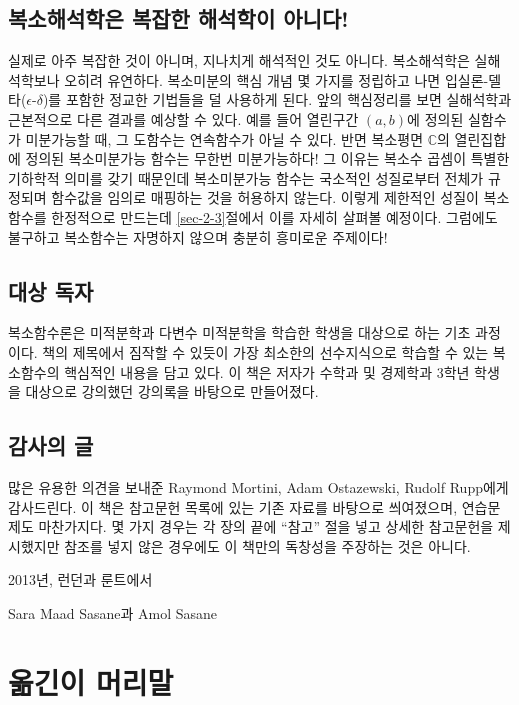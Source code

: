 \section*{복소해석학은 복잡한 해석학이 아니다!}


실제로 아주 복잡한 것이 아니며,  지나치게 해석적인 것도 아니다.
복소해석학은 실해석학보나 오히려 유연하다.
복소미분의 핵심 개념 몇 가지를 정립하고 나면 
입실론-델타($\epsilon$-$\delta$)를 포함한 정교한 기법들을 덜 사용하게 된다.
앞의 핵심정리를 보면 실해석학과 근본적으로 다른 결과를 예상할 수 있다.
예를 들어 열린구간 $(a,b)$에 정의된  실함수가 미분가능할 때, 그 도함수는 연속함수가 아닐 수 있다.
반면 복소평면 $\mathbb C$의 열린집합에 정의된 복소미분가능 함수는 
무한번 미분가능하다!
그 이유는 복소수 곱셈이 특별한 기하학적 의미를 갖기 때문인데
복소미분가능 함수는 국소적인 성질로부터 전체가 규정되며 
함수값을 임의로 매핑하는 것을 허용하지 않는다.
이렇게 제한적인 성질이 복소함수를 한정적으로 만드는데
\ref{sec-2-3}절에서 이를 자세히 살펴볼 예정이다.
그럼에도 불구하고 복소함수는 자명하지 않으며 충분히 흥미로운 주제이다!

\section*{대상 독자}

복소함수론은 미적분학과 다변수 미적분학을 학습한 학생을 대상으로 하는 기초 과정이다.
책의 제목에서 짐작할 수 있듯이
가장 최소한의 선수지식으로 학습할 수 있는 복소함수의 핵심적인 내용을 담고 있다.
이 책은 저자가 수학과 및 경제학과 3학년 학생을 대상으로 강의했던 강의록을 
바탕으로  만들어졌다.


\section*{감사의 글}

 많은 유용한 의견을 보내준 
Raymond Mortini, Adam Ostazewski, Rudolf Rupp에게 감사드린다.
이 책은 참고문헌 목록에 있는 기존 자료를 바탕으로 씌여졌으며, %
연습문제도 마찬가지다.
몇 가지 경우는 각 장의 끝에 ``참고'' 절을 넣고 상세한 참고문헌을 제시했지만
참조를 넣지 않은 경우에도 이 책만의 독창성을 주장하는 것은 아니다.

\begin{flushright}
2013년, 런던과 룬트에서

Sara Maad Sasane과 Amol Sasane
\end{flushright}

\clearpage

\chapter*[옮긴이 머리말]{옮긴이 머리말}


